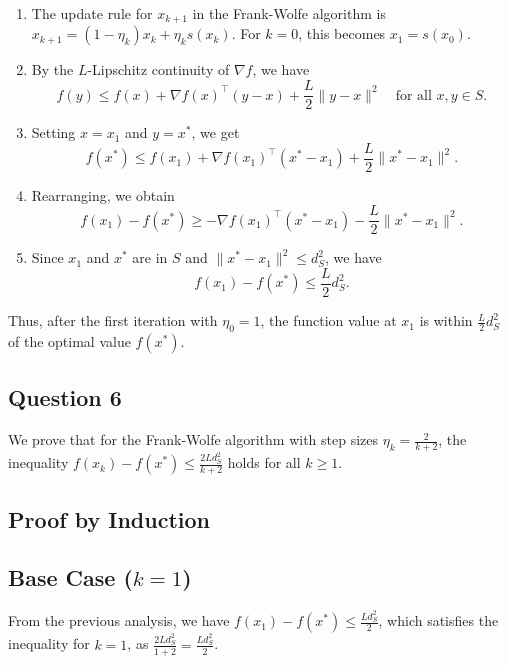 \documentclass[12p]{article}
\begin{document}
\begin{enumerate}
    \item The update rule for \( x_{k+1} \) in the Frank-Wolfe algorithm is \( x_{k+1} = (1 - \eta_k) x_k + \eta_k s(x_k) \). For \( k = 0 \), this becomes \( x_1 = s(x_0) \).

    \item By the \( L \)-Lipschitz continuity of \( \nabla f \), we have
    \[ f(y) \leq f(x) + \nabla f(x)^\top (y - x) + \frac{L}{2} \|y - x\|^2 \quad \text{for all } x, y \in S. \]

    \item Setting \( x = x_1 \) and \( y = x^* \), we get
    \[ f(x^*) \leq f(x_1) + \nabla f(x_1)^\top (x^* - x_1) + \frac{L}{2} \|x^* - x_1\|^2. \]

    \item Rearranging, we obtain
    \[ f(x_1) - f(x^*) \geq - \nabla f(x_1)^\top (x^* - x_1) - \frac{L}{2} \|x^* - x_1\|^2. \]

    \item Since \( x_1 \) and \( x^* \) are in \( S \) and \( \|x^* - x_1\|^2 \leq d_S^2 \), we have
    \[ f(x_1) - f(x^*) \leq \frac{L}{2} d_S^2. \]
\end{enumerate}

Thus, after the first iteration with \( \eta_0 = 1 \), the function value at \( x_1 \) is within \( \frac{L}{2} d_S^2 \) of the optimal value \( f(x^*) \).



\subsection*{Question 6} 

We prove that for the Frank-Wolfe algorithm with step sizes \( \eta_k = \frac{2}{k+2} \), the inequality \( f(x_k) - f(x^*) \leq \frac{2Ld^2_S}{k+2} \) holds for all \( k \geq 1 \).

\subsection*{Proof by Induction}

\subsection*{Base Case (\( k = 1 \))}
From the previous analysis, we have \( f(x_1) - f(x^*) \leq \frac{Ld^2_S}{2} \), which satisfies the inequality for \( k = 1 \), as \( \frac{2Ld^2_S}{1+2} = \frac{Ld^2_S}{2} \).
\end{document}
